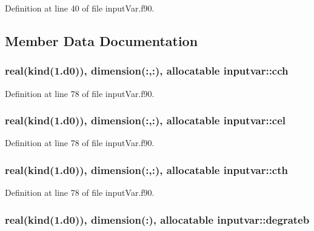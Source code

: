 Definition at line 40 of file input\-Var.\-f90.



\subsection{Member Data Documentation}
\hypertarget{classinputvar_a0f5658ba736453b1bc8c607069f9bea1}{
\subsubsection[{cch}]{\setlength{\rightskip}{0pt plus 5cm}real(kind(1.d0)), dimension(\-:,\-:), allocatable inputvar\-::cch}}\label{classinputvar_a0f5658ba736453b1bc8c607069f9bea1}


Definition at line 78 of file input\-Var.\-f90.

\hypertarget{classinputvar_a82b36ae2c53d6e6f9653b138e3e7452d}{
\subsubsection[{cel}]{\setlength{\rightskip}{0pt plus 5cm}real(kind(1.d0)), dimension(\-:,\-:), allocatable inputvar\-::cel}}\label{classinputvar_a82b36ae2c53d6e6f9653b138e3e7452d}


Definition at line 78 of file input\-Var.\-f90.

\hypertarget{classinputvar_aca5ff14156cf1451425195acac825d1d}{
\subsubsection[{cth}]{\setlength{\rightskip}{0pt plus 5cm}real(kind(1.d0)), dimension(\-:,\-:), allocatable inputvar\-::cth}}\label{classinputvar_aca5ff14156cf1451425195acac825d1d}


Definition at line 78 of file input\-Var.\-f90.

\hypertarget{classinputvar_a62a3dfedaea148a2ae030b1f142663d9}{
\subsubsection[{degrateb}]{\setlength{\rightskip}{0pt plus 5cm}real(kind(1.d0)), dimension(\-:), allocatable inputvar\-::degrateb}}\label{classinputvar_a62a3dfedaea148a2ae030b1f142663d9}


